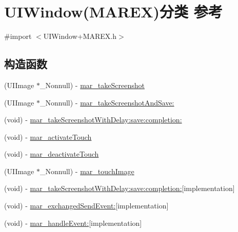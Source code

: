 \hypertarget{category_u_i_window_07_m_a_r_e_x_08}{}\section{U\+I\+Window(M\+A\+R\+EX)分类 参考}
\label{category_u_i_window_07_m_a_r_e_x_08}


{\ttfamily \#import $<$U\+I\+Window+\+M\+A\+R\+E\+X.\+h$>$}

\subsection*{构造函数}
\begin{DoxyCompactItemize}
\item 
(U\+I\+Image $\ast$\+\_\+\+Nonnull) -\/ \hyperlink{category_u_i_window_07_m_a_r_e_x_08_aa4a084b4c8c836e2de2c470a37d16366}{mar\+\_\+take\+Screenshot}
\item 
(U\+I\+Image $\ast$\+\_\+\+Nonnull) -\/ \hyperlink{category_u_i_window_07_m_a_r_e_x_08_aae87a16f810524fee2628bfec163e62a}{mar\+\_\+take\+Screenshot\+And\+Save\+:}
\item 
(void) -\/ \hyperlink{category_u_i_window_07_m_a_r_e_x_08_a823ef4c7c8756f501c28f446c5ea16ea}{mar\+\_\+take\+Screenshot\+With\+Delay\+:save\+:completion\+:}
\item 
(void) -\/ \hyperlink{category_u_i_window_07_m_a_r_e_x_08_ad98de94b1271e4dea2a61d17900765fe}{mar\+\_\+activate\+Touch}
\item 
(void) -\/ \hyperlink{category_u_i_window_07_m_a_r_e_x_08_a7691e40c83a137847d9dbce00dcf433e}{mar\+\_\+deactivate\+Touch}
\item 
(U\+I\+Image $\ast$\+\_\+\+Nonnull) -\/ \hyperlink{category_u_i_window_07_m_a_r_e_x_08_a09f489344cca735cd0cc1fc93f79bfee}{mar\+\_\+touch\+Image}
\item 
(void) -\/ \hyperlink{category_u_i_window_07_m_a_r_e_x_08_a02248150860fdd087050f79767f67d3e}{mar\+\_\+take\+Screenshot\+With\+Delay\+:save\+:completion\+:}{\ttfamily  \mbox{[}implementation\mbox{]}}
\item 
(void) -\/ \hyperlink{category_u_i_window_07_m_a_r_e_x_08_a87e401295a1f200b4ddcfb0d72837958}{mar\+\_\+exchanged\+Send\+Event\+:}{\ttfamily  \mbox{[}implementation\mbox{]}}
\item 
(void) -\/ \hyperlink{category_u_i_window_07_m_a_r_e_x_08_a642e9bf0cf8413f06039a37dc18e1f0f}{mar\+\_\+handle\+Event\+:}{\ttfamily  \mbox{[}implementation\mbox{]}}
\end{DoxyCompactItemize}


